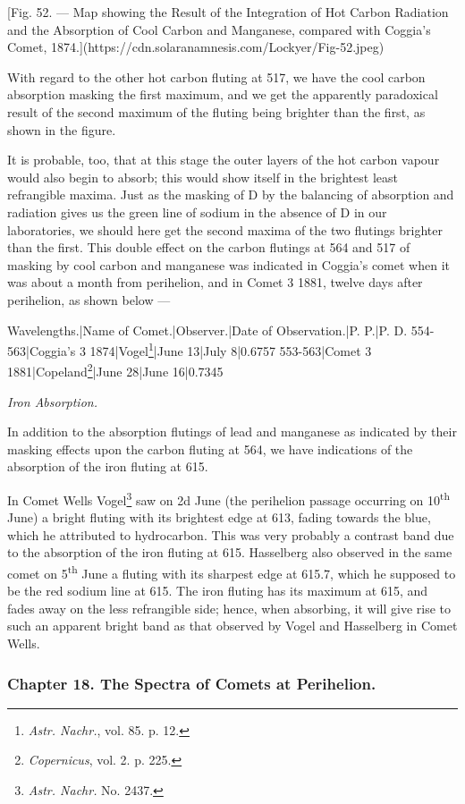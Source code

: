 \documentclass[a4paper, 12pt, oneside, polutonikogreek, english]{article}
\begin{document}
[Fig. 52. --- Map showing the Result of the Integration of Hot Carbon Radiation and the Absorption of Cool Carbon and Manganese, compared with Coggia's Comet, 1874.](https://cdn.solaranamnesis.com/Lockyer/Fig-52.jpeg)

With regard to the other hot carbon fluting at 517, we have the cool carbon absorption masking the first maximum, and we get the apparently paradoxical result of the second maximum of the fluting being brighter than the first, as shown in the figure.

It is probable, too, that at this stage the outer layers of the hot carbon vapour would also begin to absorb; this would show itself in the brightest least refrangible maxima. Just as the masking of D by the balancing of absorption and radiation gives us the green line of sodium in the absence of D in our laboratories, we should here get the second maxima of the two flutings brighter than the first. This double effect on the carbon flutings at 564 and 517 of masking by cool carbon and manganese was indicated in Coggia's comet when it was about a month from perihelion, and in Comet 3 1881, twelve days after perihelion, as shown below ---

Wavelengths.|Name of Comet.|Observer.|Date of Observation.|P. P.|P. D. 
554-563|Coggia's 3 1874|Vogel\footnote{\emph{Astr. Nachr.}, vol. 85. p. 12.}|June 13|July 8|0.6757 
553-563|Comet 3 1881|Copeland\footnote{\emph{Copernicus}, vol. 2. p. 225.}|June 28|June 16|0.7345

\emph{Iron Absorption.}

In addition to the absorption flutings of lead and manganese as indicated by their masking effects upon the carbon fluting at 564, we have indications of the absorption of the iron fluting at 615.

In Comet Wells Vogel\footnote{\emph{Astr. Nachr.} No. 2437.} saw on 2d June (the perihelion passage occurring on 10\textsuperscript{th} June) a bright fluting with its brightest edge at 613, fading towards the blue, which he attributed to hydrocarbon. This was very probably a contrast band due to the absorption of the iron fluting at 615. Hasselberg also observed in the same comet on 5\textsuperscript{th} June a fluting with its sharpest edge at 615.7, which he supposed to be the red sodium line at 615. The iron fluting has its maximum at 615, and fades away on the less refrangible side; hence, when absorbing, it will give rise to such an apparent bright band as that observed by Vogel and Hasselberg in Comet Wells.
\clearpage
\subsubsection{Chapter 18. The Spectra of Comets at Perihelion.}
\end{document}
